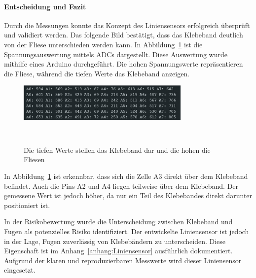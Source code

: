 \documentclass[main.tex]{subfiles} %
\begin{document}
\paragraph{Entscheidung und Fazit}  
Durch die Messungen konnte das Konzept des Liniensensors erfolgreich überprüft 
und validiert werden. Das folgende Bild bestätigt, dass das Klebeband deutlich 
von der Fliese unterschieden werden kann. In 
Abbildung~\ref{fig:Auswertung_Strecke_Beispiel} ist die Spannungsauswertung 
mittels ADCs dargestellt. Diese Auswertung wurde mithilfe eines Arduino 
durchgeführt. Die hohen Spannungswerte repräsentieren die Fliese, während die 
tiefen Werte das Klebeband anzeigen.

\begin{figure}[H]
    \centering
    \includegraphics[width=0.75\textwidth]{fig_Strecke_Tracken/Auswertung_Strecke.pdf}
    \caption{Die tiefen Werte stellen das Klebeband dar und die hohen die Fliesen}~\label{fig:Auswertung_Strecke_Beispiel}
\end{figure}

In Abbildung~\ref{fig:Auswertung_Strecke_Beispiel} ist erkennbar, dass sich die 
Zelle A3 direkt über dem Klebeband befindet. Auch die Pins A2 und A4 liegen 
teilweise über dem Klebeband. Der gemessene Wert ist jedoch höher, da nur ein 
Teil des Klebebandes direkt darunter positioniert ist.

In der Risikobewertung wurde die Unterscheidung zwischen Klebeband und Fugen 
als potenzielles Risiko identifiziert. Der entwickelte Liniensensor ist jedoch 
in der Lage, Fugen zuverlässig von Klebebändern zu unterscheiden. Diese 
Eigenschaft ist im Anhang~\ref{anhang:Liniensensor} ausführlich dokumentiert. 
Aufgrund der klaren und reproduzierbaren Messwerte wird dieser Liniensensor 
eingesetzt.
\end{document}
